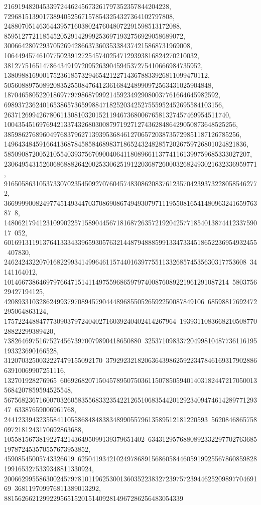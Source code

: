 {{{   21691948204533972446245673261797352357844204228, 
   729681513901738940525671578543254327364102797808, 
   24880705146364439571603802476048072291598513172088, 
   859512772118545205291429992536971932756929058689072, 
   30066428072937052694286637360353384374215868731969008, 
   1064494574610775023912725457402547129393816824270210032, 
   38127751651478643491972095263904594537275410666984735952, 
   1380988169001752361857329465421227143678833926811099470112, 
   50560889750892083525508476412361684248990972563431025904848, 
   1870465805220186977979868799921459234929080037761664645982592, 
   69893723624016538657365998847182520342527555952452695584103156, 
   2637126994267806113081032015211946736800676581327457469954511740, 
   100435451697694213374326803008797192712743628486429050873648525256, 
   3859862768960497683796271393953684612706572038735729851187126785256, 
   149643484591664136878458584689837186524324828572026759726801024821836, 
   5850908720052105540393756709004064118089661137741161399759685333027207, 
   230649543152606868882642002533062519122036872600032682493021632336959771, 
   9165058631053733070235450927076045748308620837612357042393732280585462772, 
   36699990082497745149344703708690867494930797111955081654148096324165976387\
8, 
   14806217941231099022571589044567181687263572192042577185401387441233759017\
052, 601691311913764133343396593057632144879488859913347334518652236954932455\
407830, 246242432207016822993414996461157440163977551133268574535630317753608\
34141164012, 1014667386469797664715141149755968659797400876089221961291087214\
580375629427194125, 420893310328624993797089457904448968550526592250087849106\
68598817692472295064863124, 1757224488477730903797240402716039240402414267964\
193931108366821050877028822299389420, 738264697516752745673970079890418650880\
32537109833720499810487736116195193323690166528, 3120703250032227479155092170\
379292321820636439862592234784616931790288663910069907251116, 132701928276965\
606926820715045789507503611507850594014031824472170500135684207859594525548, 
   56756823671600703260583556833235422126510683544201292340947461428977129347\
63387659006961768, 2441233943235584110558684848383489905579613589512181220593\
56208468657580972181243170692863688, 1055815673819227421436495099139379651402\
6343129576880892332297702763685197872453570557673953852, 45908545005743326619\
6250419342102497868915686058446059199255678608598281991653275339348811330924, 
   20066299558630024579781011962530013603522383272397572394462520989770469169\
368119709976811389013292, 881562662129922956515201514092814967286256483054339\
}}}

